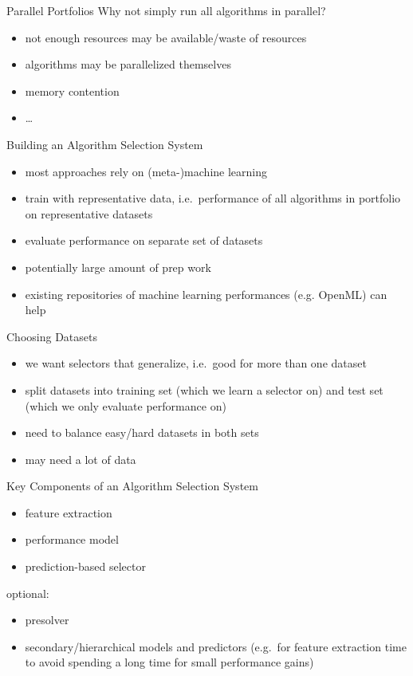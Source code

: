 \begin{frame}[c]{Parallel Portfolios}
Why not simply run all algorithms in parallel?
\begin{itemize}
\item not enough resources may be available/waste of resources
\item algorithms may be parallelized themselves
\item memory contention
\item \ldots
\end{itemize}
\end{frame}

\begin{frame}[c]{Building an Algorithm Selection System}
\begin{itemize}
    \item most approaches rely on (meta-)machine learning
\item train with representative data, i.e.\ performance of all algorithms in
    portfolio on representative datasets
\item evaluate performance on separate set of datasets
\item potentially large amount of prep work
\item existing repositories of machine learning performances (e.g. OpenML) can
    help
\end{itemize}
\end{frame}

\begin{frame}[c]{Choosing Datasets}
\begin{itemize}
\item we want selectors that generalize, i.e.\ good for more than one
dataset
\item split datasets into training set (which we learn a selector on) and test set
(which we only evaluate performance on)
\item need to balance easy/hard datasets in both sets
\item may need a lot of data
\end{itemize}
\end{frame}

\begin{frame}[c]{Key Components of an Algorithm Selection System}
\begin{itemize}
\item feature extraction
\item performance model
\item prediction-based selector
\end{itemize}
optional:
\begin{itemize}
\item presolver
\item secondary/hierarchical models and predictors (e.g.\ for feature extraction
    time to avoid spending a long time for small performance gains)
\end{itemize}
\end{frame}


